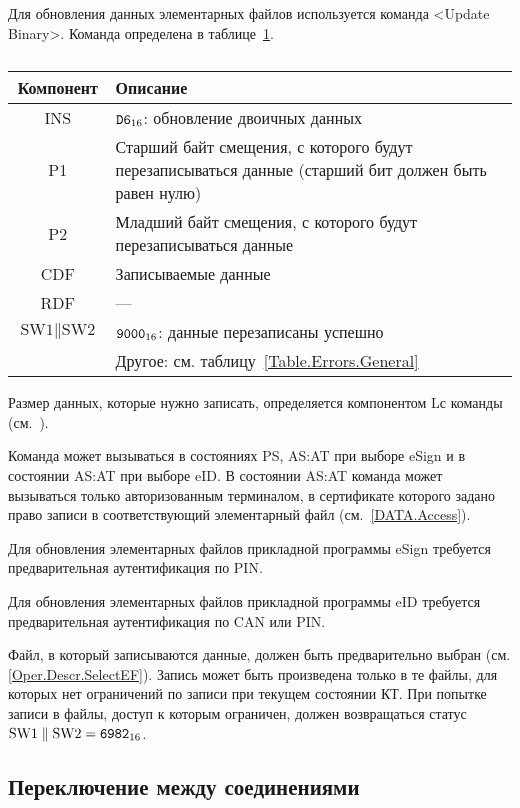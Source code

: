 Для обновления данных элементарных файлов используется команда <Update Binary>.
Команда определена в таблице~\ref{Table.Oper.UpdateCmd}.

\begin{table}[hbt]
\caption{}\label{Table.Oper.UpdateCmd}
\begin{tabular}{|c|p{14cm}|}
\hline
Компонент & Описание\\
\hline
\hline
INS & $\texttt{D6}_{16}$: обновление двоичных данных\\
\hline
P1 & Старший байт смещения, с которого будут перезаписываться данные 
(старший бит должен быть равен нулю)\\
\hline
P2 & Младший байт смещения, с которого будут перезаписываться данные \\
\hline
CDF & Записываемые данные \\
\hline 
\hline
RDF &  --- \\
\hline
$\text{SW1} \parallel \text{SW2}$ & 
$\texttt{9000}_{16}$: данные перезаписаны успешно \\
\cline{2-2}
 & Другое: см. таблицу~\ref{Table.Errors.General} \\
\hline
\end{tabular}
\end{table}

Размер данных, которые нужно записать, определяется компонентом Lс команды 
(см.~\cite{APDU}).

Команда может вызываться в состояниях PS, AS:AT 
при выборе eSign и в состоянии AS:AT при выборе eID.
В состоянии AS:AT команда может вызываться только 
авторизованным терминалом, в сертификате которого
задано право записи в соответствующий элементарный 
файл (см.~\ref{DATA.Access}).

Для обновления элементарных файлов прикладной программы eSign 
требуется предварительная аутентификация по PIN.

Для обновления элементарных файлов прикладной программы eID 
требуется предварительная аутентификация по CAN или PIN.

Файл, в который записываются данные, должен быть предварительно
выбран (см. \ref{Oper.Descr.SelectEF}).
Запись может быть произведена только в те файлы, для которых 
нет ограничений по записи при текущем состоянии КТ. 
При попытке записи в файлы, доступ к которым ограничен, 
должен возвращаться статус $\text{SW1} \parallel\text{SW2} = \texttt{6982}_{16}$. 

\subsection{Переключение между соединениями}
\label{Oper.Descr.SetCS}

